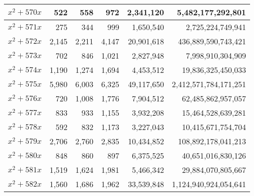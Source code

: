 \documentclass{article}
\begin{document}
\begin{center}
\begin{tabular}{ | c | r | r | r | r | r | }
$x^2 + 570x$ & 522 & 558 & 972 & 2{,}341{,}120 & 5{,}482{,}177{,}292{,}801 \\ \hline
$x^2 + 571x$ & 275 & 344 & 999 & 1{,}650{,}540 & 2{,}725{,}224{,}749{,}941 \\ \hline
$x^2 + 572x$ & 2{,}145 & 2{,}211 & 4{,}147 & 20{,}901{,}618 & 436{,}889{,}590{,}743{,}421 \\ \hline
$x^2 + 573x$ & 702 & 846 & 1{,}021 & 2{,}827{,}948 & 7{,}998{,}910{,}304{,}909 \\ \hline
$x^2 + 574x$ & 1{,}190 & 1{,}274 & 1{,}694 & 4{,}453{,}512 & 19{,}836{,}325{,}450{,}033 \\ \hline
$x^2 + 575x$ & 5{,}980 & 6{,}003 & 6{,}325 & 49{,}117{,}650 & 2{,}412{,}571{,}784{,}171{,}251 \\ \hline
$x^2 + 576x$ & 720 & 1{,}008 & 1{,}776 & 7{,}904{,}512 & 62{,}485{,}862{,}957{,}057 \\ \hline
$x^2 + 577x$ & 833 & 933 & 1{,}155 & 3{,}932{,}208 & 15{,}464{,}528{,}639{,}281 \\ \hline
$x^2 + 578x$ & 592 & 832 & 1{,}173 & 3{,}227{,}043 & 10{,}415{,}671{,}754{,}704 \\ \hline
$x^2 + 579x$ & 2{,}706 & 2{,}760 & 2{,}835 & 10{,}434{,}852 & 108{,}892{,}178{,}041{,}213 \\ \hline
$x^2 + 580x$ & 848 & 860 & 897 & 6{,}375{,}525 & 40{,}651{,}016{,}830{,}126 \\ \hline
$x^2 + 581x$ & 1{,}519 & 1{,}624 & 1{,}981 & 5{,}466{,}342 & 29{,}884{,}070{,}805{,}667 \\ \hline
$x^2 + 582x$ & 1{,}560 & 1{,}686 & 1{,}962 & 33{,}539{,}848 & 1{,}124{,}940{,}924{,}054{,}641 \\ \hline

\end{tabular}\pagebreak

\begin{tabular}{ | c | r | r | r | r | r | }
\hline


\end{tabular}
\end{center}
\end{document}

